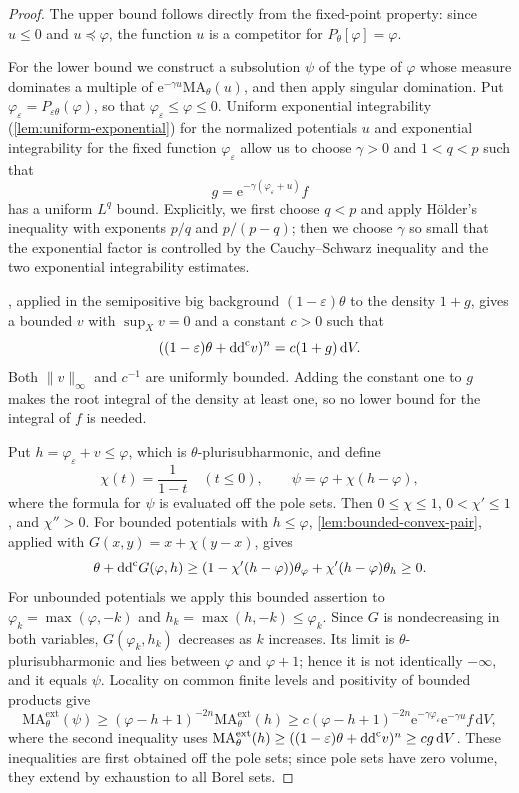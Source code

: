 \begin{proof}
The upper bound follows directly from the fixed-point property: since $u\leq0$ and $u\preceq\varphi$, the function $u$ is a competitor for $P_\theta[\varphi]=\varphi$.

For the lower bound we construct a subsolution $\psi$ of the type of $\varphi$ whose measure dominates a multiple of $\mathrm{e}^{-\gamma u}\mathrm{MA}_\theta(u)$, and then apply singular domination. Put $\varphi_\varepsilon=P_{\varepsilon\theta}(\varphi)$, so that $\varphi_\varepsilon\leq\varphi\leq0$. Uniform exponential integrability (\cref{lem:uniform-exponential}) for the normalized potentials $u$ and exponential integrability for the fixed function $\varphi_\varepsilon$ allow us to choose $\gamma>0$ and $1<q<p$ such that
\[
 g=\mathrm{e}^{-\gamma(\varphi_\varepsilon+u)}f
\]
has a uniform $L^q$ bound. Explicitly, we first choose $q<p$ and apply H\"older's inequality with exponents $p/q$ and $p/(p-q)$; then we choose $\gamma$ so small that the exponential factor is controlled by the Cauchy--Schwarz inequality and the two exponential integrability estimates.

, applied in the semipositive big background $(1-\varepsilon)\theta$ to the density $1+g$, gives a bounded $v$ with $\sup_Xv=0$ and a constant $c>0$ such that
\[
 ((1-\varepsilon)\theta+\mathrm{dd}^{\mathrm{c}} v)^n=c(1+g)\,\mathrm{d}V.
\]
Both $\|v\|_\infty$ and $c^{-1}$ are uniformly bounded. Adding the constant one to $g$ makes the root integral of the density at least one, so no lower bound for the integral of $f$ is needed.

Put $h=\varphi_\varepsilon+v\leq\varphi$, which is $\theta$-plurisubharmonic, and define
\[
 \chi(t)=\frac1{1-t}\quad(t\leq0),\qquad
 \psi=\varphi+\chi(h-\varphi),
\]
where the formula for $\psi$ is evaluated off the pole sets. Then $0\leq\chi\leq1$, $0<\chi'\leq1$, and $\chi''>0$. For bounded potentials with $h\leq\varphi$, \cref{lem:bounded-convex-pair}, applied with $G(x,y)=x+\chi(y-x)$, gives
\[
 \theta+\mathrm{dd}^{\mathrm{c}} G(\varphi,h)
 \geq(1-\chi'(h-\varphi))\theta_\varphi
       +\chi'(h-\varphi)\theta_h\geq0.
\]
For unbounded potentials we apply this bounded assertion to $\varphi_k=\max(\varphi,-k)$ and $h_k=\max(h,-k)\leq\varphi_k$. Since $G$ is nondecreasing in both variables, $G(\varphi_k,h_k)$ decreases as $k$ increases. Its limit is $\theta$-plurisubharmonic and lies between $\varphi$ and $\varphi+1$; hence it is not identically $-\infty$, and it equals $\psi$. Locality on common finite levels and positivity of bounded products give
\[
 \mathrm{MA}^{\mathrm{ext}}_\theta(\psi)
 \geq(\varphi-h+1)^{-2n}\mathrm{MA}^{\mathrm{ext}}_\theta(h)
 \geq c(\varphi-h+1)^{-2n}\mathrm{e}^{-\gamma\varphi_\varepsilon}
             \mathrm{e}^{-\gamma u}f\,\mathrm{d}V,
\]
where the second inequality uses $\mathrm{MA}^{\mathrm{ext}}_\theta(h)\geq((1-\varepsilon)\theta+\mathrm{dd}^{\mathrm{c}} v)^n\geq cg\,\mathrm{d}V$. These inequalities are first obtained off the pole sets; since pole sets have zero volume, they extend by exhaustion to all Borel sets.


\end{proof}
